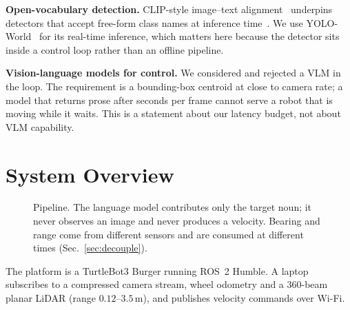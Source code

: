 \documentclass[conference]{IEEEtran}
\begin{document}
\textbf{Open-vocabulary detection.} CLIP-style image--text
alignment~\cite{clip} underpins detectors that accept free-form class names at
inference time~\cite{owlvit,groundingdino,yoloworld}. We use
YOLO-World~\cite{yoloworld} for its real-time inference, which matters here
because the detector sits inside a control loop rather than an offline pipeline.

\textbf{Vision-language models for control.} We considered and rejected a VLM
in the loop. The requirement is a bounding-box centroid at close to camera rate;
a model that returns prose after seconds per frame cannot serve a robot that is
moving while it waits. This is a statement about our latency budget, not about
VLM capability.

\section{System Overview}
\label{sec:system}

\begin{figure}[t]
\centering
{}
\caption{Pipeline. The language model contributes only the target noun; it
never observes an image and never produces a velocity. Bearing and range come
from different sensors and are consumed at different times
(Sec.~\ref{sec:decouple}).}
\label{fig:pipeline}
\end{figure}

The platform is a TurtleBot3 Burger running ROS~2 Humble. A laptop subscribes to
a compressed camera stream, wheel odometry and a 360-beam planar LiDAR
(range $0.12$--$3.5$\,m), and publishes velocity commands over Wi-Fi.
\end{document}
